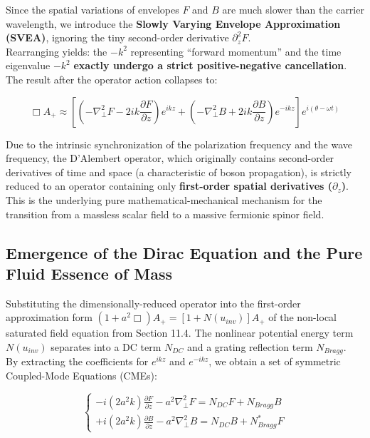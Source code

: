 \documentclass[12pt, a4paper]{article}
\begin{document}
Since the spatial variations of envelopes $F$ and $B$ are much slower than the carrier wavelength, we introduce the \textbf{Slowly Varying Envelope Approximation (SVEA)}, ignoring the tiny second-order derivative $\partial_z^2 F$.\\
Rearranging yields: the $-k^2$ representing ``forward momentum'' and the time eigenvalue $-k^2$ \textbf{exactly undergo a strict positive-negative cancellation}. The result after the operator action collapses to:

\begin{equation}
\Box A_+ \approx \left[ (-\nabla_\perp^2 F - 2ik\frac{\partial F}{\partial z}) e^{ikz} + (-\nabla_\perp^2 B + 2ik\frac{\partial B}{\partial z}) e^{-ikz} \right] e^{i(\theta - \omega t)} 
\end{equation}

Due to the intrinsic synchronization of the polarization frequency and the wave frequency, the D'Alembert operator, which originally contains second-order derivatives of time and space (a characteristic of boson propagation), is strictly reduced to an operator containing only \textbf{first-order spatial derivatives ($\partial_z$)}. This is the underlying pure mathematical-mechanical mechanism for the transition from a massless scalar field to a massive fermionic spinor field.

\subsection{Emergence of the Dirac Equation and the Pure Fluid Essence of Mass}

Substituting the dimensionally-reduced operator into the first-order approximation form $(1 + a^2\Box) A_+ = [1 + N(u_{inv})] A_+$ of the non-local saturated field equation from Section 11.4. The nonlinear potential energy term $N(u_{inv})$ separates into a DC term $N_{DC}$ and a grating reflection term $N_{Bragg}$.\\
By extracting the coefficients for $e^{ikz}$ and $e^{-ikz}$, we obtain a set of symmetric Coupled-Mode Equations (CMEs):

\begin{equation}
\begin{cases}
- i (2a^2 k) \frac{\partial F}{\partial z} - a^2 \nabla_\perp^2 F = N_{DC} F + N_{Bragg} B \\
+ i (2a^2 k) \frac{\partial B}{\partial z} - a^2 \nabla_\perp^2 B = N_{DC} B + N_{Bragg}^* F
\end{cases}
\end{equation}
\end{document}

